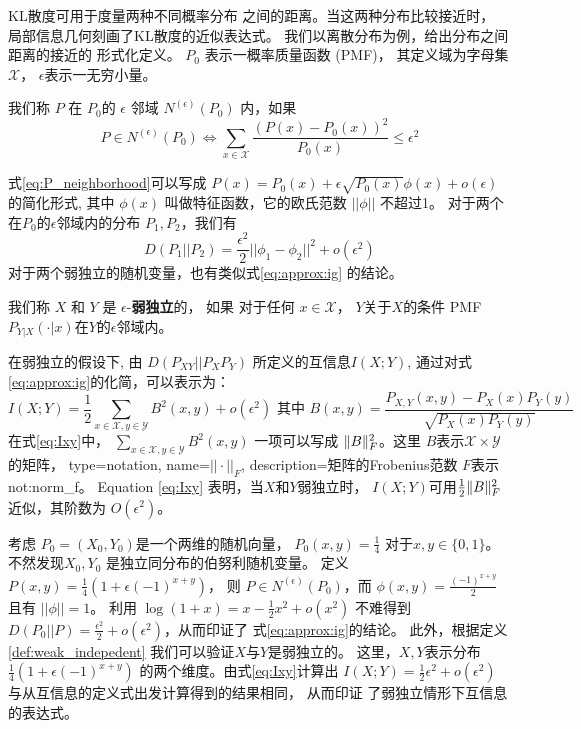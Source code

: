 KL散度可用于度量两种不同概率分布
之间的距离。当这两种分布比较接近时，
局部信息几何刻画了KL散度的近似表达式。
我们以离散分布为例，给出分布之间距离的接近的
形式化定义。
$P_0$ 表示一概率质量函数 (PMF)，
其定义域为字母集$\mathcal{X}$，
$\epsilon$表示一无穷小量。
\begin{definition}\label{def:eps_neighborhood}
我们称 $P$ 在 $P_0$的 $\epsilon$ 邻域 $N^{(\epsilon)}(P_0)$ 内，如果
\begin{equation}\label{eq:P_neighborhood}
P \in N^{(\epsilon)}(P_0) \iff
\sum_{x \in \mathcal{X}} \frac{(P(x) - P_0(x))^2}{P_0(x)} \leq \epsilon^2
\end{equation}
\end{definition}
式\eqref{eq:P_neighborhood}可以写成 $P(x) = P_0(x) + \epsilon
\sqrt{P_0(x)} \phi(x) + o(\epsilon)$的简化形式, 其中 $\phi(x)$
叫做特征函数，它的欧氏范数 $||\phi || $ 不超过1。
对于两个在$P_0$的$\epsilon$邻域内的分布 $P_1, P_2$，我们有
\begin{equation}\label{eq:approx:ig}
D(P_1 || P_2) = \frac{\epsilon^2}{2} ||\phi_1 - \phi_2||^2 + o(\epsilon^2)
\end{equation}
对于两个弱独立的随机变量，也有类似式\ref{eq:approx:ig}
的结论。
\begin{definition}\label{def:weak_indepedent}
我们称 $X$ 和 $Y$ 是 $\epsilon$-\textbf{弱独立}的，
如果 对于任何 $x \in \mathcal{X}$，
$Y$关于$X$的条件 PMF 
$P_{Y|X}(\cdot |x)$在$Y$的$\epsilon$邻域内。
\end{definition}
在弱独立的假设下, 由 $D(P_{XY}||P_XP_Y)$ 所定义的互信息$I(X;Y)$, 
通过对式\eqref{eq:approx:ig}的化简，可以表示为：
\begin{equation}\label{eq:Ixy}
I(X;Y) = \frac{1}{2}\sum_{x\in \mathcal{X}, y\in \mathcal{Y}} B^2(x,y) + o(\epsilon^2)
\textrm{ 其中 }  B(x,y)=\frac{P_{X,Y}(x,y) - P_X(x) P_Y(y)}{\sqrt{P_X(x)P_Y(y)}}
\end{equation}
在式\eqref{eq:Ixy}中， $\sum_{x\in \mathcal{X}, y\in \mathcal{Y}} B^2(x,y)$
一项可以写成 $\lVert B\rVert_F^2$。这里 $B$表示$\mathcal{X} \times \mathcal{Y}$的矩阵，
{
  type=notation,
  name={$||\cdot||_F$},
  description={矩阵的Frobenius范数}
}
$F$表示 \glsdesc{not:norm_f}。
Equation \eqref{eq:Ixy} 表明，当$X$和$Y$弱独立时，
$I(X;Y)$可用$\frac{1}{2} \lVert B\rVert_F^2$
近似，其阶数为 $O(\epsilon^2)$。

\begin{example}\label{ex:Pweak_1}
考虑 $P_0=(X_0,Y_0)$是一个两维的随机向量，
$P_0(x,y)=\frac{1}{4}$ 对于$x,y \in \{0,1\}$。
不然发现$X_0,Y_0$
是独立同分布的伯努利随机变量。
定义 $P(x,y)=\frac{1}{4}(1+\epsilon (-1)^{x+y})$，
则 $P\in N^{(\epsilon)}(P_0)$，而
$\phi(x,y) = \frac{(-1)^{x+y}}{2}$
且有 $||\phi||=1$。
利用 $\log(1+x) = x - \frac{1}{2}x^2 + o(x^2)$
不难得到 $D(P_0||P)=\frac{\epsilon^2}{2}
+o(\epsilon^2)$，从而印证了
式\eqref{eq:approx:ig}的结论。
此外，根据定义\ref{def:weak_indepedent}
我们可以验证$X$与$Y$是弱独立的。
这里，$X,Y$表示分布$\frac{1}{4}(1+\epsilon (-1)^{x+y})$
的两个维度。由式\eqref{eq:Ixy}计算出
$I(X;Y)=\frac{1}{2}\epsilon^2+o(\epsilon^2)$
与从互信息的定义式出发计算得到的结果相同，
从而印证
了弱独立情形下互信息的表达式。
\end{example}
     
